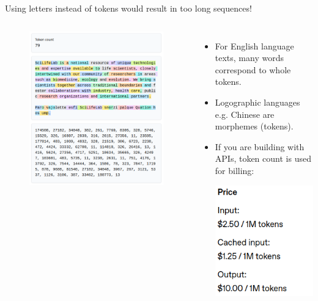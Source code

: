 \documentclass[10pt]{beamer}
\begin{document}
\begin{frame}{Using letters instead of tokens would result in too long sequences!}
	\begin{columns}[T,onlytextwidth]
		\hspace*{-0.7cm} 
		\begin{figure}
			\includegraphics[width=\textwidth]{figures/TikTokenizer.png}
		\end{figure}
		\vspace{0.7cm}
		\begin{itemize}
			\item For English language texts, many words correspond to whole tokens. 
			\item Logographic languages e.g. Chinese are morphemes (tokens).
			 \item If you are building with APIs, token count is used for billing: \vspace{0.2cm} \par
			 \includegraphics[height=0.3\textheight]{figures/PricingExampleOpenAIGPt4o.png}

\end{itemize}
\end{columns}
\end{frame}
\end{document}
